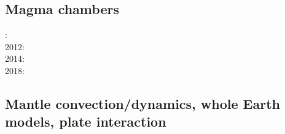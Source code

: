 \subsection{Magma chambers}

{\scriptsize
{}: \cite{spyk82}\\
2012: \cite{gerb12}\cite{gech12}\\
2014: \cite{cuwi14}\\
2018: \cite{gehn18}
}


\subsection{Mantle convection/dynamics, whole Earth models, plate interaction}

